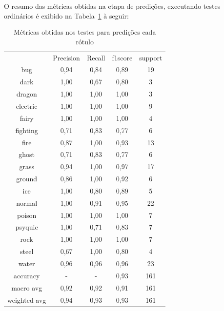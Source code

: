 \documentclass[12pt]{article}
\begin{document}
O resumo das métricas obtidas na etapa de predições, executando testes ordinários é exibido na Tabela~\ref{tab:exampleTab2} à seguir:

\begin{table}[H]
    \centering
    \caption{Métricas obtidas nos testes para predições cada rótulo}
    \label{tab:exampleTab2}
    \begin{tabular}{c|c|c|c|c}
                    &   Precision &  Recall   & f1score   & support\\ 
        bug         &      0,94   &   0,84    &  0,89     &   19\\
        dark        &      1,00   &   0,67    &  0,80     &    3\\
        dragon      &      1,00   &   1,00    &  1,00     &    3\\
        electric    &      1,00   &   1,00    &  1,00     &    9\\
        fairy       &      1,00   &   1,00    &  1,00     &    4\\
        fighting    &      0,71   &   0,83    &  0,77     &    6\\
        fire        &      0,87   &   1,00    &  0,93     &   13\\
        ghost       &      0,71   &   0,83    &  0,77     &    6\\
        grass       &      0,94   &   1,00    &  0,97     &   17\\
        ground      &      0,86   &   1,00    &  0,92     &    6\\
        ice         &      1,00   &   0,80    &  0,89     &    5\\
        normal      &      1,00   &   0,91    &  0,95     &   22\\
        poison      &      1,00   &   1,00    &  1,00     &    7\\
        psyquic     &      1,00   &   0,71    &  0,83     &    7\\
        rock        &      1,00   &   1,00    &  1,00     &    7\\
        steel       &      0,67   &   1,00    &  0,80     &    4\\\vspace{0.5cm}
        water       &      0,96   &   0,96    &  0,96     &   23\\
        accuracy    &        -    &     -     &  0,93     &  161\\
        macro avg   &      0,92   &   0,92    &  0,91     &  161\\
        weighted avg &     0,94   &   0,93    &  0,93     &  161
    \end{tabular}
\end{table}
\end{document}
